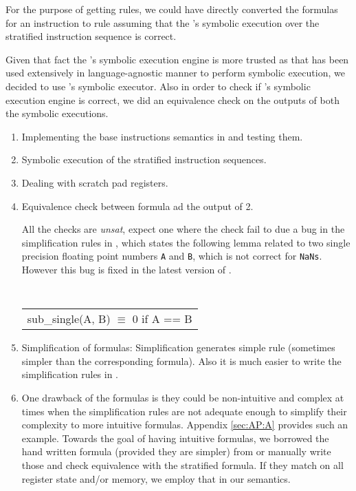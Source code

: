 For the purpose of getting  \K rules, we could have directly converted the \Strata formulas
for an instruction to \K rule assuming that the \Strata's symbolic execution over the 
stratified instruction sequence is correct.

Given that fact the \K's symbolic execution engine is more trusted as 
that has been used extensively in language-agnostic manner to perform symbolic
execution, we decided to use \K's symbolic executor. Also in order to check 
if \Strata's symbolic execution engine is correct, we did an equivalence check on 
the outputs of both the symbolic executions.   
 

\begin{enumerate}
\item Implementing the base instructions semantics in \K and testing them.
\item Symbolic execution of the stratified instruction sequences.
\item Dealing with scratch pad registers.
\item Equivalence check between \Strata formula ad the output of 2.
   
   All the checks are \emph{unsat}, expect one where the check fail to due a bug in the simplification
   rules in \Strata, which states the following lemma related to two single precision floating point numbers  {\tt A}  and {\tt B}, which is not correct for {\tt NaNs}. However this bug is fixed in 
   the latest version of \Stoke. 
   
   
   { \tt  
        \begin{tabular}[b]{l}
   \qquad sub\_single(A, B) $\equiv$ 0 if A == B     
      \end{tabular}
  }
   
\item {Simplification of formulas:}
  Simplification generates simple \K rule (sometimes simpler than the corresponding \Strata formula).
 Also it is much easier to write the simplification rules in
  \K.


\item One drawback of the \Strata formulas is they could be non-intuitive and complex at times when the simplification rules are not adequate enough to simplify their complexity to more intuitive formulas. Appendix \ref{sec:AP:A} provides such an example.
Towards the goal of having intuitive formulas, we borrowed the hand written formula (provided they are simpler) from \Stoke or manually write those  and check equivalence with the stratified formula. If they match on all register state and/or memory, we employ that in our \K semantics.


       


\end{enumerate}

